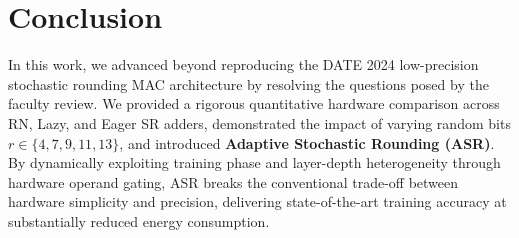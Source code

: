 \documentclass[11pt,a4paper]{article}
\begin{document}
\section{Conclusion}
In this work, we advanced beyond reproducing the DATE 2024 low-precision stochastic rounding MAC architecture by resolving the questions posed by the faculty review. We provided a rigorous quantitative hardware comparison across RN, Lazy, and Eager SR adders, demonstrated the impact of varying random bits $r \in \{4, 7, 9, 11, 13\}$, and introduced \textbf{Adaptive Stochastic Rounding (ASR)}. By dynamically exploiting training phase and layer-depth heterogeneity through hardware operand gating, ASR breaks the conventional trade-off between hardware simplicity and precision, delivering state-of-the-art training accuracy at substantially reduced energy consumption.
\end{document}
